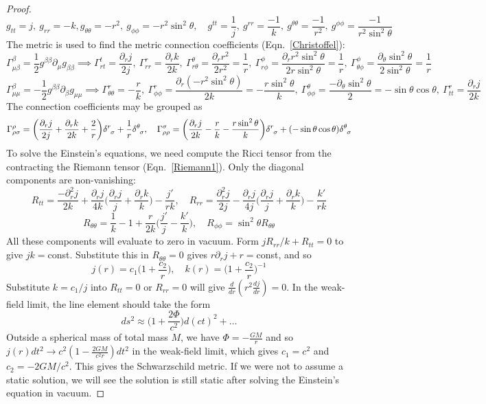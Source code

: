 \documentclass[a4paper]{article}
\theoremstyle{new}
\begin{document}
\begin{proof}
$$g_{tt}=j,~g_{rr}=-k,g_{\theta\theta}=-r^2,~g_{\phi\phi}=-r^2\sin^2\theta,\quad g^{tt}=\frac{1}{j},~g^{rr}=\frac{-1}{k},~g^{\theta\theta}=\frac{-1}{r^2},~g^{\phi\phi}=\frac{-1}{r^2\sin^2\theta}$$
The metric is used to find the metric connection coefficients (Eqn.~\ref{Christoffel}):
$$\Gamma^\beta_{\mu\beta}=\frac{1}{2}g^{\beta\beta}\partial_\mu g_{\beta\beta}\implies\Gamma^t_{rt}=\frac{\partial_rj}{2j},~\Gamma_{rr}^r=\frac{\partial_rk}{2k},~\Gamma^\theta_{r\theta}=\frac{\partial_rr^2}{2r^2}=\frac{1}{r},~\Gamma^\phi_{r\phi}=\frac{\partial_rr^2\sin^2\theta}{2r\sin^2\theta}=\frac{1}{r},~\Gamma^\phi_{\theta\phi}=\frac{\partial_\theta\sin^2\theta}{2\sin^2\theta}=\frac{1}{r}$$
$$\Gamma^\beta_{\mu\mu}=-\frac{1}{2}g^{\beta\beta}\partial_\beta g_{\mu\mu}\implies\Gamma^r_{\theta\theta}=-\frac{r}{k},~\Gamma_{\phi\phi}^r=\frac{\partial_r(-r^2\sin^2\theta)}{2k}=-\frac{r\sin^2\theta}{k},~\Gamma_{\phi\phi}^\theta=\frac{-\partial_\theta\sin^2\theta}{2}=-\sin\theta\cos\theta,~\Gamma_{tt}^r=\frac{\partial_rj}{2k}$$
The connection coefficients may be grouped as
$$\Gamma^\rho_{\rho\sigma}=\bigg(\frac{\partial_rj}{2j}+\frac{\partial_rk}{2k}+\frac{2}{r}\bigg)\tensor*{\delta}{*_{}^{r}_{\sigma}}+\frac{1}{r}\tensor*{\delta}{*_{}^{\theta}_{\sigma}},\quad\Gamma^\sigma_{\rho\rho}=\bigg(\frac{\partial_rj}{2k}-\frac{r}{k}-\frac{r\sin^2\theta}{k}\bigg)\tensor*{\delta}{*_{}^{r}_{\sigma}}+(-\sin\theta\cos\theta)\tensor*{\delta}{*_{}^{\theta}_{\sigma}}$$
To solve the Einstein's equations, we need compute the Ricci tensor from the contracting the Riemann tensor (Eqn.~\ref{Riemann1}). Only the diagonal components are non-vanishing:
$$R_{tt}=\frac{-\partial_r^2j}{2k}+\frac{\partial_rj}{4k}\bigg(\frac{\partial_rj}{j}+\frac{\partial_rk}{k}\bigg)-\frac{j'}{rk},\quad R_{rr}=\frac{\partial_r^2j}{2j}-\frac{\partial_rj}{4j}\bigg(\frac{\partial_rj}{j}+\frac{\partial_rk}{k}\bigg)-\frac{k'}{rk}$$
$$R_{\theta\theta}=\frac{1}{k}-1+\frac{r}{2k}\bigg(\frac{j'}{j}-\frac{k'}{k}\bigg),\quad R_{\phi\phi}=\sin^2\theta R_{\theta\theta}$$
All these components will evaluate to zero in vacuum. Form $jR_{rr}/k+R_{tt}=0$ to give $jk=$const. Substitute this in $R_{\theta\theta}=0$ gives $r\partial_rj+r=$const, and so
$$j(r)=c_1\bigg(1+\frac{c_2}{r}\bigg),\quad k(r)=\bigg(1+\frac{c_2}{r}\bigg)^{-1}$$
Substitute $k=c_1/j$ into $R_{tt}=0$ or $R_{rr}=0$ will give $\frac{d}{dr}(r^2\frac{dj}{dr})=0$. In the weak-field limit, the line element should take the form
$$ds^2\approx\bigg(1+\frac{2\Phi}{c^2}\bigg)d(ct)^2+\dots$$
Outside a spherical mass of total mass $M$, we have $\Phi=-\frac{GM}{r}$ and so $j(r)dt^2\rightarrow c^2(1-\frac{2GM}{c^2r})dt^2$ in the weak-field limit, which gives $c_1=c^2$ and $c_2=-2GM/c^2$. This gives the Schwarzschild metric. If we were not to assume a static solution, we will see the solution is still static after solving the Einstein's equation in vacuum.
\end{proof}
\end{document}
